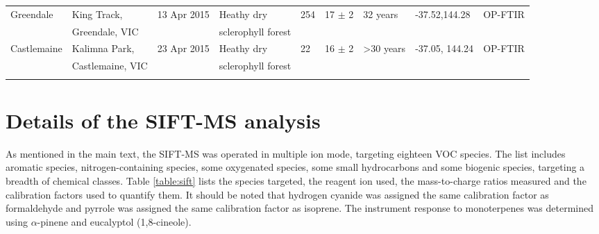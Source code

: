 \documentclass[acp, manuscript]{copernicus}
\begin{document}
\begin{sidewaystable}
\begin{tabular}{l l l l  l l l l l }
 Greendale&King Track, &13 Apr 2015&Heathy dry &254&17 $\pm$ 2&32 years&-37.52,144.28&OP-FTIR\\ 
 &Greendale, VIC&&sclerophyll forest&&&&&\\
 Castlemaine&Kalimna Park, &23 Apr 2015&Heathy dry&22&16 $\pm$ 2&>30 years&-37.05, 144.24&OP-FTIR\\
 &Castlemaine, VIC&&sclerophyll forest&&&&&\\
    \bottomhline
  \end{tabular}
  \label{table:fires}
\end{sidewaystable}

\section{Details of the SIFT-MS analysis}
As mentioned in the main text, the SIFT-MS was operated in multiple ion mode, targeting eighteen VOC species. The list includes aromatic species, nitrogen-containing species, some oxygenated species, some small hydrocarbons and some biogenic species, targeting a breadth of chemical classes. Table \ref{table:sift} lists the species targeted, the reagent ion used, the mass-to-charge ratios measured and the calibration factors used to quantify them. 
It should be noted that hydrogen cyanide was assigned the same calibration factor as formaldehyde and pyrrole was assigned the same calibration factor as isoprene. The instrument response to monoterpenes was determined using $\alpha$-pinene and eucalyptol (1,8-cineole). 
\end{document}

